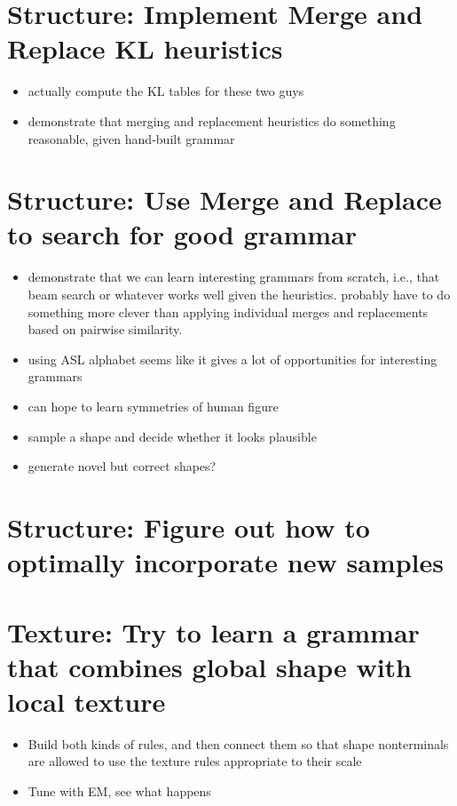 \documentclass{book}
\begin{document}
\section{Structure: Implement Merge and Replace KL heuristics}
\label{sec-5_17}

\begin{itemize}
\item actually compute the KL tables for these two guys
\item demonstrate that merging and replacement heuristics do something
    reasonable, given hand-built grammar
\end{itemize}
\section{Structure: Use Merge and Replace to search for good grammar}
\label{sec-5_18}

\begin{itemize}
\item demonstrate that we can learn interesting grammars from scratch,
    i.e., that beam search or whatever works well given the
    heuristics. probably have to do something more clever than
    applying individual merges and replacements based on pairwise
    similarity.
\item using ASL alphabet seems like it gives a lot of opportunities for
    interesting grammars
\item can hope to learn symmetries of human figure
\item sample a shape and decide whether it looks plausible
\item generate novel but correct shapes?
\end{itemize}
\section{Structure: Figure out how to optimally incorporate new samples}
\label{sec-5_19}
\section{Texture: Try to learn a grammar that combines global shape with local texture}
\label{sec-5_20}


\begin{itemize}
\item Build both kinds of rules, and then connect them so that shape
    nonterminals are allowed to use the texture rules appropriate to
    their scale
\item Tune with EM, see what happens
\end{itemize}
\end{document}

